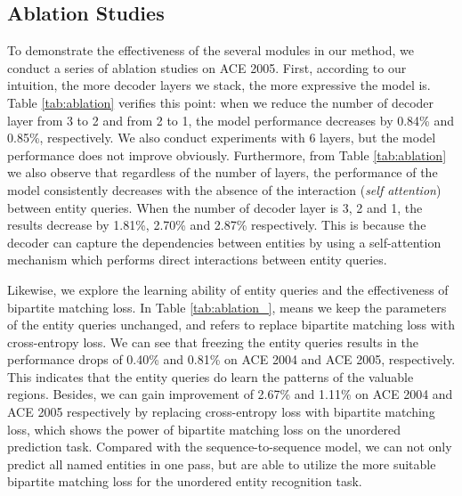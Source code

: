 \documentclass{article}
\begin{document}
\subsection{Ablation Studies}
To demonstrate the effectiveness of the several modules in our method, we conduct a series of ablation studies on ACE 2005. First, according to our intuition, the more decoder layers we stack, the more expressive the model is. Table \ref{tab:ablation} verifies this point: when we reduce the number of decoder layer from 3 to 2 and from 2 to 1, the model performance decreases by 0.84\% and 0.85\%, respectively. We also conduct experiments with 6 layers, but the model performance does not improve obviously. Furthermore, from Table \ref{tab:ablation} we also observe that regardless of the number of layers, the performance of the model consistently decreases with the absence of the interaction (\textit{self attention}) between entity queries. When the number of decoder layer is 3, 2 and 1, the results decrease by 1.81\%, 2.70\% and 2.87\% respectively. This is because the decoder can capture the dependencies between entities by using a self-attention mechanism which performs direct interactions between entity queries.

Likewise, we explore the learning ability of entity queries and the effectiveness of bipartite matching loss. In Table \ref{tab:ablation_},  means we keep the parameters of the entity queries unchanged, and  refers to replace bipartite matching loss with cross-entropy loss. We can see that freezing the entity queries results in the performance drops of 0.40\% and 0.81\% on ACE 2004 and ACE 2005, respectively. This indicates that the entity queries do learn the patterns of the valuable regions. Besides, we can gain improvement of 2.67\% and 1.11\% on ACE 2004 and ACE 2005 respectively by replacing cross-entropy loss with bipartite matching loss, which shows the power of bipartite matching loss on the unordered prediction task. Compared with the sequence-to-sequence model, we can not only predict all named entities in one pass, but are able to utilize the more suitable bipartite matching loss for the unordered entity recognition task.
\end{document}
